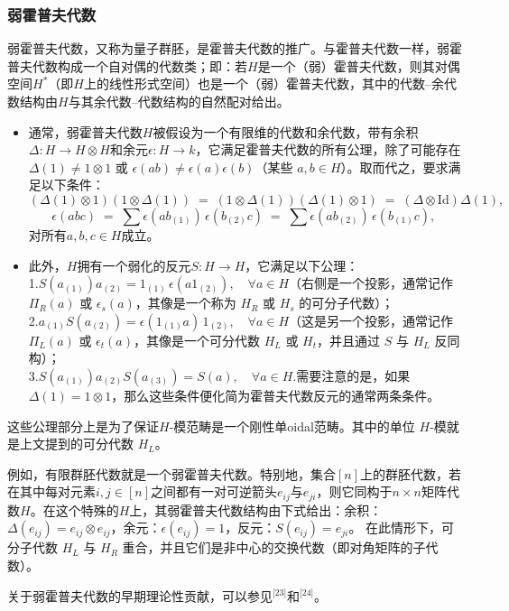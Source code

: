 \subsubsection{弱霍普夫代数}
弱霍普夫代数，又称为量子群胚，是霍普夫代数的推广。与霍普夫代数一样，弱霍普夫代数构成一个自对偶的代数类；即：若$H$是一个（弱）霍普夫代数，则其对偶空间$H^*$（即$H$上的线性形式空间）也是一个（弱）霍普夫代数，其中的代数–余代数结构由$H$与其余代数–代数结构的自然配对给出。
\begin{itemize}
\item 通常，弱霍普夫代数$H$被假设为一个有限维的代数和余代数，带有余积$\Delta: H \to H \otimes H$和余元$\epsilon: H \to k$，它满足霍普夫代数的所有公理，除了可能存在 $\Delta(1) \neq 1 \otimes 1$ 或 $\epsilon(ab) \neq \epsilon(a)\epsilon(b)$（某些 $a,b \in H$）。取而代之，要求满足以下条件：
$$
(\Delta(1)\otimes 1)(1\otimes \Delta(1)) \;=\; (1\otimes \Delta(1))(\Delta(1)\otimes 1) \;=\; (\Delta \otimes \mathrm{Id})\Delta(1),~
$$
$$
\epsilon(abc) \;=\; \sum \epsilon(ab_{(1)}) \, \epsilon(b_{(2)}c) \;=\; \sum \epsilon(ab_{(2)}) \, \epsilon(b_{(1)}c),~
$$
对所有$a,b,c \in H$成立。
\item 此外，$H$拥有一个弱化的反元$S: H \to H$，它满足以下公理：\\
1.$S(a_{(1)})a_{(2)} = 1_{(1)} \, \epsilon(a1_{(2)}), \quad \forall a \in H$（右侧是一个投影，通常记作 $\Pi_R(a)$ 或 $\epsilon_s(a)$，其像是一个称为 $H_R$ 或 $H_s$ 的可分子代数）；\\
2.$a_{(1)} S(a_{(2)}) = \epsilon(1_{(1)}a) \, 1_{(2)}, \quad \forall a \in H$（这是另一个投影，通常记作 $\Pi_L(a)$ 或 $\epsilon_t(a)$，其像是一个可分代数 $H_L$ 或 $H_t$，并且通过 $S$ 与 $H_L$ 反同构）；\\
3.$S(a_{(1)})a_{(2)}S(a_{(3)}) = S(a), \quad \forall a \in H$.需要注意的是，如果 $\Delta(1) = 1 \otimes 1$，那么这些条件便化简为霍普夫代数反元的通常两条条件。
\end{itemize}
这些公理部分上是为了保证$H$-模范畴是一个刚性单oidal范畴。其中的单位 $H$-模就是上文提到的可分代数 $H_L$。

例如，有限群胚代数就是一个弱霍普夫代数。特别地，集合$[n]$上的群胚代数，若在其中每对元素$i, j \in [n]$之间都有一对可逆箭头$e_{ij}$与$e_{ji}$，则它同构于$n \times n$矩阵代数$H$。在这个特殊的$H$上，其弱霍普夫代数结构由下式给出：余积：$\Delta(e_{ij}) = e_{ij} \otimes e_{ij}$，余元：$\epsilon(e_{ij}) = 1$，反元：$S(e_{ij}) = e_{ji}$。
在此情形下，可分子代数 $H_L$ 与 $H_R$ 重合，并且它们是非中心的交换代数（即对角矩阵的子代数）。

关于弱霍普夫代数的早期理论性贡献，可以参见\(^\text{[23]}\)和\(^\text{[24]}\)。
